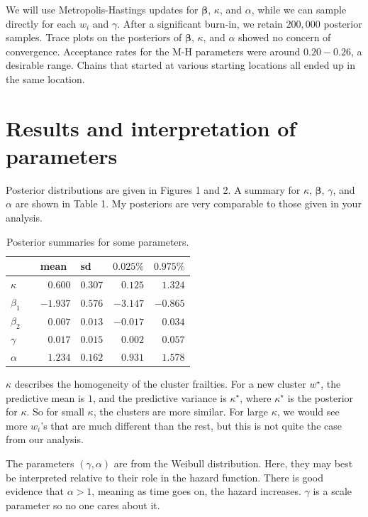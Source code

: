 \documentclass[12pt]{article}
\newcommand{\m}[1]{\mathbf{\bm{#1}}}
\begin{document}
\noindent We will use Metropolis-Hastings updates for $\m{\beta}$, $\kappa$, and $\alpha$, while we can sample directly for each $w_i$ and $\gamma$. After a significant burn-in, we retain $200,000$ posterior samples. Trace plots on the posteriors of $\m{\beta}$, $\kappa$, and $\alpha$ showed no concern of convergence. Acceptance rates for the M-H parameters were around $0.20-0.26$, a desirable range. Chains that started at various starting locations all ended up in the same location.

\section*{Results and interpretation of parameters}

\noindent Posterior distributions are given in Figures 1 and 2. A summary for $\kappa$, $\m{\beta}$, $\gamma$, and $\alpha$ are shown in Table 1. My posteriors are very comparable to those given in your analysis.
\bigskip

\begin{table}[ht]
\centering
\begin{tabular}{lcrrrr}
\hline\hline
& & \multicolumn{1}{l}{mean} & \multicolumn{1}{l}{sd} &
    \multicolumn{1}{l}{$0.025\%$} & \multicolumn{1}{l}{$0.975\%$} \\ \hline
$\kappa $ & & $ 0.600$ & $0.307$ & $ 0.125$ & $ 1.324$ \\
$\beta_1$ & & $-1.937$ & $0.576$ & $-3.147$ & $-0.865$ \\
$\beta_2$ & & $ 0.007$ & $0.013$ & $-0.017$ & $ 0.034$ \\
$\gamma $ & & $ 0.017$ & $0.015$ & $ 0.002$ & $ 0.057$ \\
$\alpha $ & & $ 1.234$ & $0.162$ & $ 0.931$ & $ 1.578$ \\
\hline\hline
\end{tabular}
\caption{Posterior summaries for some parameters.}
\end{table}

\noindent $\kappa$ describes the homogeneity of the cluster frailties. For a new cluster $w^\star$, the predictive mean is $1$, and the predictive variance is $\kappa^\star$, where $\kappa^\star$ is the posterior for $\kappa$. So for small $\kappa$, the clusters are more similar. For large $\kappa$, we would see more $w_i$'s that are much different than the rest, but this is not quite the case from our analysis.
\bigskip

\noindent The parameters $(\gamma,\alpha)$ are from the Weibull distribution. Here, they may best be interpreted relative to their role in the hazard function. There is good evidence that $\alpha>1$, meaning as time goes on, the hazard increases. $\gamma$ is a scale parameter so no one cares about it.
\bigskip
\end{document}
